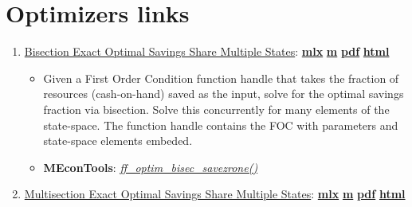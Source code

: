 \documentclass[
]{book}
\providecommand{\tightlist}{%
  \setlength{\itemsep}{0pt}\setlength{\parskip}{0pt}}
\begin{document}
\hypertarget{optimizers-links}{%
\section{Optimizers links}\label{optimizers-links}}

\begin{enumerate}
\def\labelenumi{\arabic{enumi}.}
\tightlist
\item
  \href{https://fanwangecon.github.io/MEconTools/MEconTools/doc/optim/htmlpdfm/fx_optim_bisec_savezrone.html}{Bisection Exact Optimal Savings Share Multiple States}: \href{https://github.com/FanWangEcon/MEconTools/blob/master/MEconTools/doc/optim/fx_optim_bisec_savezrone.mlx}{\textbf{mlx}} \textbar{} \href{https://github.com/FanWangEcon/MEconTools/blob/master/MEconTools/doc/optim/htmlpdfm/fx_optim_bisec_savezrone.m}{\textbf{m}} \textbar{} \href{https://github.com/FanWangEcon/MEconTools/blob/master/MEconTools/doc/optim/htmlpdfm/fx_optim_bisec_savezrone.pdf}{\textbf{pdf}} \textbar{} \href{https://fanwangecon.github.io/MEconTools/MEconTools/doc/optim/htmlpdfm/fx_optim_bisec_savezrone.html}{\textbf{html}}

  \begin{itemize}
  \tightlist
  \item
    Given a First Order Condition function handle that takes the fraction of resources (cash-on-hand) saved as the input, solve for the optimal savings fraction via bisection. Solve this concurrently for many elements of the state-space. The function handle contains the FOC with parameters and state-space elements embeded.
  \item
    \textbf{MEconTools}: \emph{\href{https://github.com/FanWangEcon/MEconTools/blob/master/MEconTools/optim/ff_optim_bisec_savezrone.m}{ff\_optim\_bisec\_savezrone()}}
  \end{itemize}
\item
  \href{https://fanwangecon.github.io/MEconTools/MEconTools/doc/optim/htmlpdfm/fx_optim_mlsec_savezrone.html}{Multisection Exact Optimal Savings Share Multiple States}: \href{https://github.com/FanWangEcon/MEconTools/blob/master/MEconTools/doc/optim/fx_optim_mlsec_savezrone.mlx}{\textbf{mlx}} \textbar{} \href{https://github.com/FanWangEcon/MEconTools/blob/master/MEconTools/doc/optim/htmlpdfm/fx_optim_mlsec_savezrone.m}{\textbf{m}} \textbar{} \href{https://github.com/FanWangEcon/MEconTools/blob/master/MEconTools/doc/optim/htmlpdfm/fx_optim_mlsec_savezrone.pdf}{\textbf{pdf}} \textbar{} \href{https://fanwangecon.github.io/MEconTools/MEconTools/doc/optim/htmlpdfm/fx_optim_mlsec_savezrone.html}{\textbf{html}}


\end{enumerate}
\end{document}
